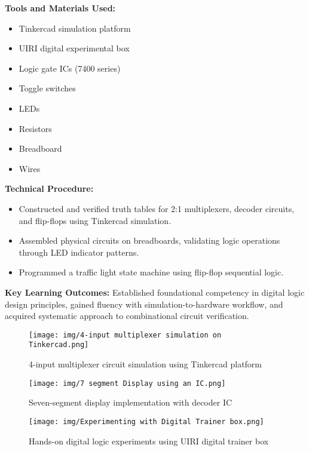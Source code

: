 \documentclass[12pt,a4paper]{report}
\begin{document}
\textbf{Tools and Materials Used:}
\begin{multicols}{2}
\begin{itemize}
    \item Tinkercad simulation platform
    \item UIRI digital experimental box
    \item Logic gate ICs (7400 series)
    \item Toggle switches
    \item LEDs
    \item Resistors
    \item Breadboard
    \item Wires
\end{itemize}
\end{multicols}

\noindent\textbf{Technical Procedure:}
\begin{itemize}
    \item Constructed and verified truth tables for 2:1 multiplexers, decoder circuits, and flip-flops using Tinkercad simulation.
    \item Assembled physical circuits on breadboards, validating logic operations through LED indicator patterns.
    \item Programmed a traffic light state machine using flip-flop sequential logic.
\end{itemize}

\noindent\textbf{Key Learning Outcomes:} Established foundational competency in digital logic design principles, gained fluency with simulation-to-hardware workflow, and acquired systematic approach to combinational circuit verification.

\begin{figure}[H]
\centering
\texttt{[image: img/4-input multiplexer simulation on Tinkercad.png]}
\caption{4-input multiplexer circuit simulation using Tinkercad platform}
\label{fig:multiplexer-sim}
\end{figure}

\begin{figure}[H]
\centering
\texttt{[image: img/7 segment Display using an IC.png]}
\caption{Seven-segment display implementation with decoder IC}
\label{fig:7segment-display}
\end{figure}

\begin{figure}[H]
\centering
\texttt{[image: img/Experimenting with Digital Trainer box.png]}
\caption{Hands-on digital logic experiments using UIRI digital trainer box}
\label{fig:digital-trainer}
\end{figure}
\end{document}
